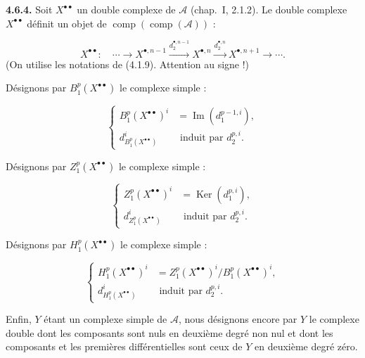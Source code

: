 \clearpage
{}%
\begingroup\small\setlength{\parskip}{0pt}\setlength{\emergencystretch}{1.5em}
\setlength{\abovedisplayskip}{4pt plus 2pt minus 2pt}%
\setlength{\belowdisplayskip}{4pt plus 2pt minus 2pt}%

\noindent\textbf{4.6.4.}\quad
Soit $X^{\bullet\bullet}$ un double complexe de $\mathcal A$
(chap.~I, 2.1.2). Le double complexe $X^{\bullet\bullet}$ définit un objet
de $\operatorname{comp}(\operatorname{comp}(\mathcal A))$ :

\[
X^{\bullet\bullet}\colon\quad
\cdots\longrightarrow X^{\bullet,n-1}
\xrightarrow{d_2^{\bullet,n-1}}X^{\bullet,n}
\xrightarrow{d_2^{\bullet,n}}X^{\bullet,n+1}
\longrightarrow\cdots.
\]
(On utilise les notations de (4.1.9). Attention au signe !)

Désignons par $B_1^p(X^{\bullet\bullet})$ le complexe simple :

\[
\left\{
\begin{aligned}
B_1^p(X^{\bullet\bullet})^i
  &=\operatorname{Im}(d_1^{p-1,i}),\\
d_{B_1^p(X^{\bullet\bullet})}^{i}
  &\text{ induit par }d_2^{p,i}.
\end{aligned}
\right.
\tag{4.6.4.1}
\]

Désignons par $Z_1^p(X^{\bullet\bullet})$ le complexe simple :

\[
\left\{
\begin{aligned}
Z_1^p(X^{\bullet\bullet})^i
  &=\operatorname{Ker}(d_1^{p,i}),\\
d_{Z_1^p(X^{\bullet\bullet})}^{i}
  &\text{ induit par }d_2^{p,i}.
\end{aligned}
\right.
\tag{4.6.4.2}
\]

Désignons par $H_1^p(X^{\bullet\bullet})$ le complexe simple :

\[
\left\{
\begin{aligned}
H_1^p(X^{\bullet\bullet})^i
  &=Z_1^p(X^{\bullet\bullet})^i/B_1^p(X^{\bullet\bullet})^i,\\
d_{H_1^p(X^{\bullet\bullet})}^{i}
  &\text{ induit par }d_2^{p,i}.
\end{aligned}
\right.
\tag{4.6.4.3}
\]

Enfin, $Y$ étant un complexe simple de $\mathcal A$, nous désignons encore
par $Y$ le complexe double dont les composants sont nuls en deuxième degré
non nul et dont les composants et les premières différentielles sont ceux de
$Y$ en deuxième degré zéro.

